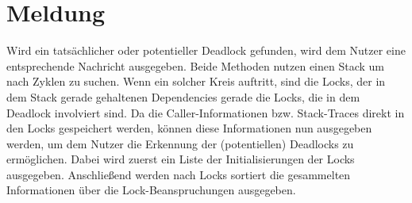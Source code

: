 \section{Meldung}
Wird ein tatsächlicher oder potentieller Deadlock gefunden, wird dem Nutzer 
eine entsprechende Nachricht ausgegeben. Beide Methoden nutzen einen Stack um 
nach Zyklen zu suchen. Wenn ein solcher Kreis auftritt, sind die Locks, der in 
dem Stack gerade gehaltenen Dependencies gerade die Locks, die in dem Deadlock
involviert sind. Da die Caller-Informationen bzw. Stack-Traces direkt in den 
Locks gespeichert werden, können diese Informationen nun ausgegeben werden,
um dem Nutzer die Erkennung der (potentiellen) Deadlocks zu ermöglichen. 
Dabei wird zuerst ein Liste der Initialisierungen der Locks ausgegeben. 
Anschließend werden nach Locks sortiert die gesammelten Informationen über die 
Lock-Beanspruchungen ausgegeben.
